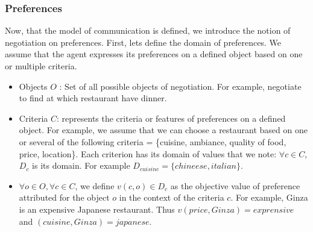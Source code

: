 \documentclass{llncs}
\begin{document}
\subsubsection{Preferences}
\par Now, that  the model of communication is defined, we introduce the notion of negotiation on preferences. First, lets define the domain of preferences. We assume that the agent expresses its preferences on a defined object based on one or multiple criteria.   
 \begin{itemize}
 \item Objects $O$ : Set of all possible objects of negotiation. For example, negotiate to find at which restaurant have dinner.
 \item Criteria $C$: represents the criteria or features of preferences on a defined object. For example, we assume that we can choose a restaurant based on one or several of the following criteria = \{cuisine, ambiance, quality of food, price, location\}. Each criterion has its domain of values that we note: $\forall c \in C$, $D_{c}$ is its domain. For example $D_{cuisine} = \{chineese, italian\}$.

 \item $\forall o \in O, \forall c \in C$, we define $v(c,o) \in D_{c}$ as the objective value of preference attributed for the object $o$ in the context of the criteria $c$. For example, Ginza is an expensive Japanese restaurant. Thus $v(price, Ginza) = exprensive$ and $(cuisine, Ginza) = japanese$. 
 

\end{itemize}
\end{document}
